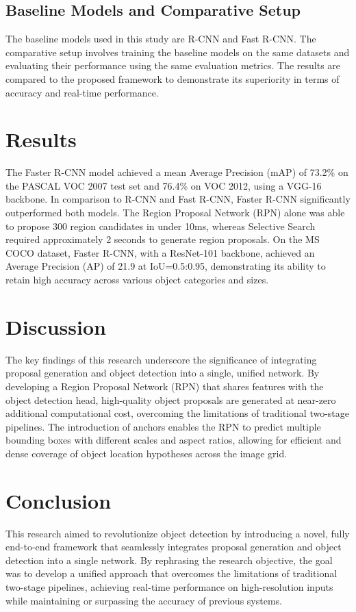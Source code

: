 \documentclass{article}
\begin{document}
\subsection{Baseline Models and Comparative Setup}
The baseline models used in this study are R-CNN and Fast R-CNN. The comparative setup involves training the baseline models on the same datasets and evaluating their performance using the same evaluation metrics. The results are compared to the proposed framework to demonstrate its superiority in terms of accuracy and real-time performance.

\section{Results}
The Faster R-CNN model achieved a mean Average Precision (mAP) of 73.2\% on the PASCAL VOC 2007 test set and 76.4\% on VOC 2012, using a VGG-16 backbone. In comparison to R-CNN and Fast R-CNN, Faster R-CNN significantly outperformed both models. The Region Proposal Network (RPN) alone was able to propose 300 region candidates in under 10ms, whereas Selective Search required approximately 2 seconds to generate region proposals. On the MS COCO dataset, Faster R-CNN, with a ResNet-101 backbone, achieved an Average Precision (AP) of 21.9 at IoU=0.5:0.95, demonstrating its ability to retain high accuracy across various object categories and sizes.

\section{Discussion}
The key findings of this research underscore the significance of integrating proposal generation and object detection into a single, unified network. By developing a Region Proposal Network (RPN) that shares features with the object detection head, high-quality object proposals are generated at near-zero additional computational cost, overcoming the limitations of traditional two-stage pipelines. The introduction of anchors enables the RPN to predict multiple bounding boxes with different scales and aspect ratios, allowing for efficient and dense coverage of object location hypotheses across the image grid.

\section{Conclusion}
This research aimed to revolutionize object detection by introducing a novel, fully end-to-end framework that seamlessly integrates proposal generation and object detection into a single network. By rephrasing the research objective, the goal was to develop a unified approach that overcomes the limitations of traditional two-stage pipelines, achieving real-time performance on high-resolution inputs while maintaining or surpassing the accuracy of previous systems.
\end{document}
